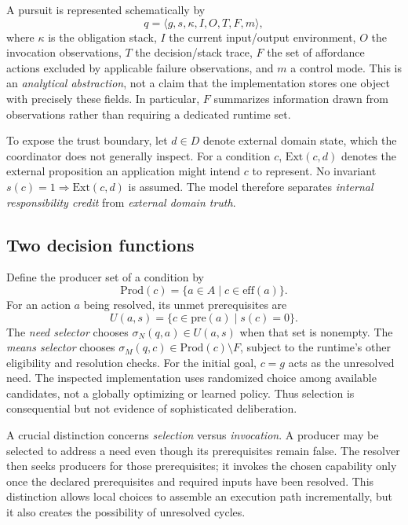 \documentclass[11pt]{article}
\begin{document}
A pursuit is represented schematically by
\begin{equation}
q=\langle g,s,\kappa,I,O,T,F,m\rangle,
\label{eq:pursuit}
\end{equation}
where $\kappa$ is the obligation stack, $I$ the current input/output environment, $O$ the invocation observations, $T$ the decision/stack trace, $F$ the set of affordance actions excluded by applicable failure observations, and $m$ a control mode. This is an \emph{analytical abstraction}, not a claim that the implementation stores one object with precisely these fields. In particular, $F$ summarizes information drawn from observations rather than requiring a dedicated runtime set.

To expose the trust boundary, let $d\in D$ denote external domain state, which the coordinator does not generally inspect. For a condition $c$, $\mathrm{Ext}(c,d)$ denotes the external proposition an application might intend $c$ to represent. No invariant $s(c)=1\Rightarrow\mathrm{Ext}(c,d)$ is assumed. The model therefore separates \emph{internal responsibility credit} from \emph{external domain truth}.

\subsection{Two decision functions}
Define the producer set of a condition by
\begin{equation}
\mathrm{Prod}(c)=\{a\in A\mid c\in\mathrm{eff}(a)\}.
\end{equation}
For an action $a$ being resolved, its unmet prerequisites are
\begin{equation}
U(a,s)=\{c\in\mathrm{pre}(a)\mid s(c)=0\}.
\end{equation}
The \emph{need selector} chooses $\sigma_N(q,a)\in U(a,s)$ when that set is nonempty. The \emph{means selector} chooses $\sigma_M(q,c)\in\mathrm{Prod}(c)\setminus F$, subject to the runtime's other eligibility and resolution checks. For the initial goal, $c=g$ acts as the unresolved need. The inspected implementation uses randomized choice among available candidates, not a globally optimizing or learned policy. Thus selection is consequential but not evidence of sophisticated deliberation.

A crucial distinction concerns \emph{selection} versus \emph{invocation}. A producer may be selected to address a need even though its prerequisites remain false. The resolver then seeks producers for those prerequisites; it invokes the chosen capability only once the declared prerequisites and required inputs have been resolved. This distinction allows local choices to assemble an execution path incrementally, but it also creates the possibility of unresolved cycles.
\end{document}
